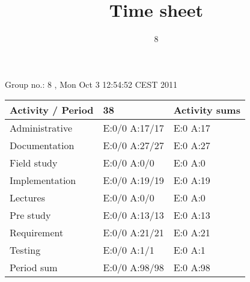 \documentclass[a4paper]{article}
\title{Time sheet}
\author{8}
\begin{document}
\begin{landscape}
\begin{center}
	Group no.: 8
	, Mon Oct 3 12:54:52 CEST 2011

	\begin{tabular}{| l | l | l |}
		\hline
		Activity / Period & 38 & Activity sums \\
		\hline \hline
		
Administrative & E:0/0 A:17/17 & E:0 A:17 \\
Documentation & E:0/0 A:27/27 & E:0 A:27 \\
Field study & E:0/0 A:0/0 & E:0 A:0 \\
Implementation & E:0/0 A:19/19 & E:0 A:19 \\
Lectures & E:0/0 A:0/0 & E:0 A:0 \\
Pre study & E:0/0 A:13/13 & E:0 A:13 \\
Requirement & E:0/0 A:21/21 & E:0 A:21 \\
Testing & E:0/0 A:1/1 & E:0 A:1 \\
Period sum & E:0/0 A:98/98 & E:0 A:98 \\
		\hline
	\end{tabular}
\end{center}
\end{landscape}
\end{document}
